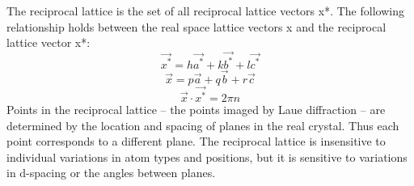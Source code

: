 The reciprocal lattice is the set of all reciprocal lattice vectors x*. The following relationship holds between the real space lattice vectors x and the reciprocal lattice vector x*:
\begin{equation}
    \vec{x^*}=h\vec{a^*}+k\vec{b^*}+l\vec{c^*}
    \label{RecipLatVecX}
\end{equation}
\begin{equation}
    \vec{x}=p\vec{a}+q\vec{b}+r\vec{c}
    \label{RealLatVecX}
\end{equation}
\begin{equation}
    \vec{x}\cdot\vec{x^*}=2\pi n
    \label{RecipRealLatVecXRelation}
\end{equation}
Points in the reciprocal lattice – the points imaged by Laue diffraction – are determined by the location and spacing of planes in the real crystal. Thus each point corresponds to a different plane. The reciprocal lattice is insensitive to individual variations in atom types and positions, but it is sensitive to variations in d-spacing or the angles between planes.
